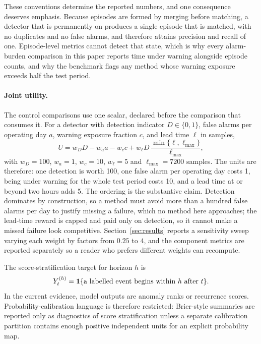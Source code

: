 These conventions determine the reported numbers, and one consequence deserves emphasis. Because episodes are formed by merging before matching, a detector that is permanently on produces a single episode that is matched, with no duplicates and no false alarms, and therefore attains precision and recall of one. Episode-level metrics cannot detect that state, which is why every alarm-burden comparison in this paper reports time under warning alongside episode counts, and why the benchmark flags any method whose warning exposure exceeds half the test period.

\paragraph{Joint utility.} The control comparisons use one scalar, declared before the comparison that consumes it. For a detector with detection indicator \(D\in\{0,1\}\), false alarms per operating day \(a\), warning exposure fraction \(c\), and lead time \(\ell\) in samples,
\[
    U=w_D D-w_a a-w_c c+w_\ell D\,\frac{\min\{\ell,\ell_{\max}\}}{\ell_{\max}},
\]
with \(w_D=100\), \(w_a=1\), \(w_c=10\), \(w_\ell=5\) and \(\ell_{\max}=7200\) samples. The units are therefore: one detection is worth 100, one false alarm per operating day costs 1, being under warning for the whole test period costs 10, and a lead time at or beyond two hours adds 5. The ordering is the substantive claim. Detection dominates by construction, so a method must avoid more than a hundred false alarms per day to justify missing a failure, which no method here approaches; the lead-time reward is capped and paid only on detection, so it cannot make a missed failure look competitive. Section~\ref{sec:results} reports a sensitivity sweep varying each weight by factors from \(0.25\) to \(4\), and the component metrics are reported separately so a reader who prefers different weights can recompute.

The score-stratification target for horizon \(h\) is
\[
    Y_t^{(h)}=\mathbf{1}\{\hbox{a labelled event begins within }h\hbox{ after }t\}.
\]
In the current evidence, model outputs are anomaly ranks or recurrence scores. Probability-calibration language is therefore restricted: Brier-style summaries are reported only as diagnostics of score stratification unless a separate calibration partition contains enough positive independent units for an explicit probability map.

